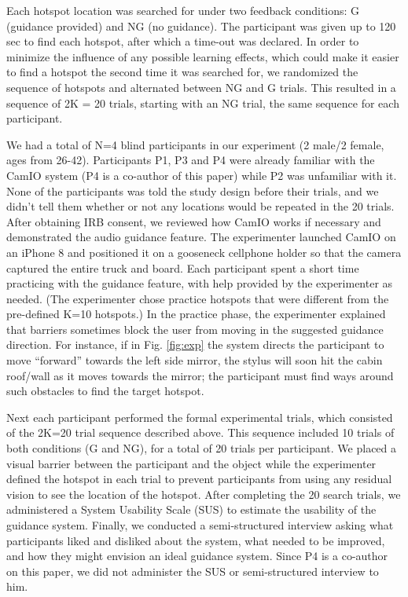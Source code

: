 \documentclass[runningheads]{res/templates/llncs}
\begin{document}
Each hotspot location was searched for under two feedback conditions: G
(guidance provided) and NG (no guidance). The participant was given up
to 120 sec to find each hotspot, after which a time-out was declared.
In order to minimize the influence of any possible learning effects,
which could make it easier to find a hotspot the second time it was
searched for, we randomized the sequence of hotspots and alternated
between NG and G trials. This resulted in a sequence of 2K = 20 trials,
starting with an NG trial, the same sequence for each participant.

We had a total of N=4 blind participants in our experiment (2 male/2
female, ages from 26-42). Participants P1, P3 and P4 were already
familiar with the CamIO system (P4 is a co-author of this paper) while
P2 was unfamiliar with it. None of the participants was told the study
design before their trials, and we didn't tell them whether or not any
locations would be repeated in the 20 trials. After obtaining IRB
consent, we reviewed how CamIO works if necessary and demonstrated the
audio guidance feature. The experimenter launched CamIO on an iPhone 8
and positioned it on a gooseneck cellphone holder so that the camera
captured the entire truck and board. Each participant spent a short time
practicing with the guidance feature, with help provided by the
experimenter as needed. (The experimenter chose practice hotspots that
were different from the pre-defined K=10 hotspots.) In the practice
phase, the experimenter explained that barriers sometimes block the user
from moving in the suggested guidance direction. For instance, if in
Fig. \ref{fig:exp} the system directs the participant to move ``forward''
towards the left side mirror, the stylus will soon hit the cabin
roof/wall as it moves towards the mirror; the participant must find ways
around such obstacles to find the target hotspot. 

Next each participant performed the formal experimental trials, which
consisted of the 2K=20 trial sequence described above. This sequence
included 10 trials of both conditions (G and NG), for a total of 20
trials per participant. We  placed a visual barrier between the participant and the object while the experimenter defined the hotspot in each trial to prevent participants from using any residual vision to see the location of the hotspot. After completing the 20 search trials, we
administered a System Usability Scale (SUS) \cite{brooke1996sus} to
estimate the usability of the guidance system. Finally, we conducted a
semi-structured interview asking what participants liked and disliked
about the system, what needed to be improved, and how they might
envision an ideal guidance system. Since P4 is a co-author on this
paper, we did not administer the SUS or semi-structured interview to
him.
\end{document}

